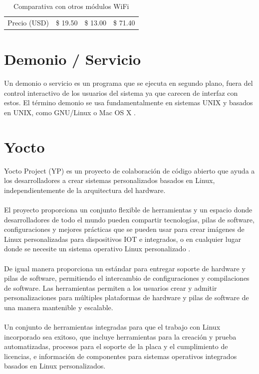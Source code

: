 \begin{longtable}{|M{2.2cm}|M{4.0cm}|M{4.0cm}|M{4.0cm}|}
    Precio (USD) & \$ 19.50 & \$ 13.00 & \$ 71.40
    \hline
	
	\caption{Comparativa con otros módulos WiFi}
	\label{tabla_riesgos}
\end{longtable}

\pagebreak

\paragraph{}

\section{Demonio / Servicio}
Un demonio o servicio es un programa que se ejecuta en segundo plano, fuera del control interactivo de los usuarios del sistema ya que carecen de interfaz con estos. El término demonio se usa fundamentalmente en sistemas UNIX y basados en UNIX, como GNU/Linux o Mac OS X \citep{MarcoTeorico4}.

\section{Yocto}
Yocto Project (YP) es un proyecto de colaboración de código abierto que ayuda a los desarrolladores a crear sistemas personalizados basados en Linux, independientemente de la arquitectura del hardware.
\paragraph{}
El proyecto proporciona un conjunto flexible de herramientas y un espacio donde desarrolladores de todo el mundo pueden compartir tecnologías, pilas de software, configuraciones y mejores prácticas que se pueden usar para crear imágenes de Linux personalizadas para dispositivos IOT e integrados, o en cualquier lugar donde se necesite un sistema operativo Linux personalizado \citep{MarcoTeoricoYocto}.
\paragraph{}
De igual manera proporciona un estándar para entregar soporte de hardware y pilas de software, permitiendo el intercambio de configuraciones y compilaciones de software. Las herramientas permiten a los usuarios crear y admitir personalizaciones para múltiples plataformas de hardware y pilas de software de una manera mantenible y escalable.
\paragraph{}
Un conjunto de herramientas integradas para que el trabajo con Linux incorporado sea exitoso, que incluye herramientas para la creación y prueba automatizadas, procesos para el soporte de la placa y el cumplimiento de licencias, e información de componentes para sistemas operativos integrados basados en Linux personalizados.
